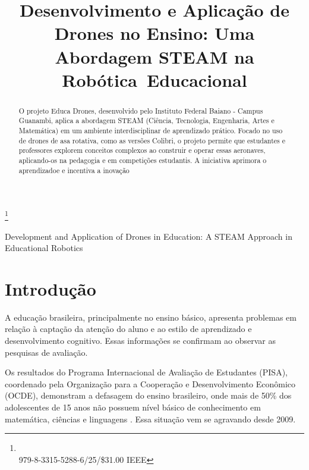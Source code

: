 \documentclass[conference]{IEEEtran}
\begin{document}
\title{Desenvolvimento e Aplicação de Drones no Ensino: Uma Abordagem STEAM na Robótica Educacional}


\maketitle
\let\thefootnote\relax\footnote{\\979-8-3315-5288-6/25/\$31.00 IEEE}

\begin{abstract}
O projeto Educa Drones, desenvolvido pelo Instituto Federal Baiano - Campus Guanambi, aplica a abordagem STEAM (Ciência, Tecnologia, Engenharia, Artes e Matemática) em um ambiente interdisciplinar de aprendizado prático. Focado no uso de drones de asa rotativa, como as versões Colibri, o projeto permite que estudantes e professores explorem conceitos complexos ao construir e operar essas aeronaves, aplicando-os na pedagogia e em competições estudantis. A iniciativa aprimora o aprendizadoe e incentiva a inovação
\end{abstract}

\begin{IEEEkeywords}
Development and Application of Drones in Education: A STEAM Approach in Educational Robotics
\end{IEEEkeywords}

\section{Introdução}

A educação brasileira, principalmente no ensino básico, apresenta problemas em relação à captação da atenção do aluno e ao estilo de aprendizado e desenvolvimento cognitivo. Essas informações se confirmam ao observar as pesquisas de avaliação.

Os resultados do Programa Internacional de Avaliação de Estudantes (PISA), coordenado pela Organização para a Cooperação e Desenvolvimento Econômico (OCDE), demonstram a defasagem do ensino brasileiro, onde mais de 50\% dos adolescentes de 15 anos não possuem nível básico de conhecimento em matemática, ciências e linguagens \cite{b6}. Essa situação vem se agravando desde 2009.
\end{document}
